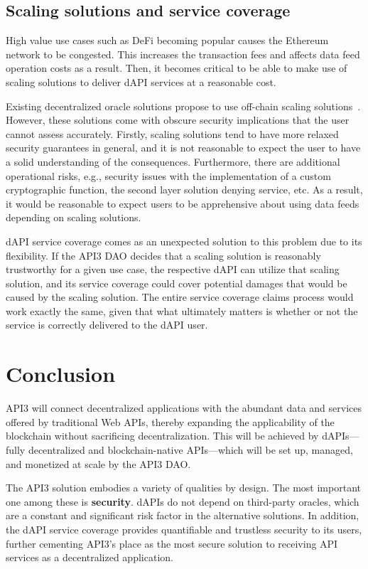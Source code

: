 \documentclass[11pt]{article}
\begin{document}
\subsection{Scaling solutions and service coverage}
\label{sec:scaling-solutions-and-service-coverage}

High value use cases such as DeFi becoming popular causes the Ethereum network to be congested.
This increases the transaction fees and affects data feed operation costs as a result.
Then, it becomes critical to be able to make use of scaling solutions to deliver dAPI services at a reasonable cost.

Existing decentralized oracle solutions propose to use off-chain scaling solutions~\cite{ellis:2017,band}.
However, these solutions come with obscure security implications that the user cannot assess accurately.
Firstly, scaling solutions tend to have more relaxed security guarantees in general, and it is not reasonable to expect the user to have a solid understanding of the consequences.
Furthermore, there are additional operational risks, e.g., security issues with the implementation of a custom cryptographic function, the second layer solution denying service, etc.
As a result, it would be reasonable to expect users to be apprehensive about using data feeds depending on scaling solutions.

dAPI service coverage comes as an unexpected solution to this problem due to its flexibility.
If the API3 DAO decides that a scaling solution is reasonably trustworthy for a given use case, the respective dAPI can utilize that scaling solution, and its service coverage could cover potential damages that would be caused by the scaling solution.
The entire service coverage claims process would work exactly the same, given that what ultimately matters is whether or not the service is correctly delivered to the dAPI user.

\section{Conclusion}
\label{sec:conclusion}

API3 will connect decentralized applications with the abundant data and services offered by traditional Web APIs, thereby expanding the applicability of the blockchain without sacrificing decentralization.
This will be achieved by dAPIs---fully decentralized and blockchain-native APIs---which will be set up, managed, and monetized at scale by the API3 DAO.

The API3 solution embodies a variety of qualities by design.
The most important one among these is \textbf{security}. dAPIs do not depend on third-party oracles, which are a constant and significant risk factor in the alternative solutions.
In addition, the dAPI service coverage provides quantifiable and trustless security to its users, further cementing API3’s place as the most secure solution to receiving API services as a decentralized application.
\end{document}
